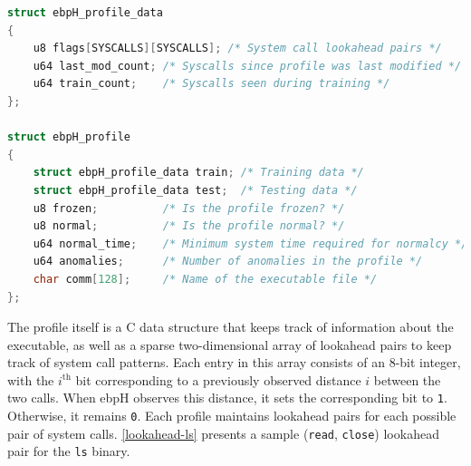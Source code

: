 \documentclass[
  12pt]{findlay}
\newcommand{\passthrough}[1]{#1}
\begin{document}
\begin{lstlisting}[language=c, label={ebph-profile-struct}, caption={A simplified
definition of the ebpH profile struct.}]
struct ebpH_profile_data
{
    u8 flags[SYSCALLS][SYSCALLS]; /* System call lookahead pairs */
    u64 last_mod_count; /* Syscalls since profile was last modified */
    u64 train_count;    /* Syscalls seen during training */
};

struct ebpH_profile
{
    struct ebpH_profile_data train; /* Training data */
    struct ebpH_profile_data test;  /* Testing data */
    u8 frozen;          /* Is the profile frozen? */
    u8 normal;          /* Is the profile normal? */
    u64 normal_time;    /* Minimum system time required for normalcy */
    u64 anomalies;      /* Number of anomalies in the profile */
    char comm[128];     /* Name of the executable file */
};
\end{lstlisting}

The profile itself is a C data structure that keeps track of information
about the executable, as well as a sparse two-dimensional array of
lookahead pairs \autocite{soma07} to keep track of system call patterns.
Each entry in this array consists of an 8-bit integer, with the
\(i^\text{th}\) bit corresponding to a previously observed distance
\(i\) between the two calls. When ebpH observes this distance, it sets
the corresponding bit to \passthrough{\lstinline!1!}. Otherwise, it
remains \passthrough{\lstinline!0!}. Each profile maintains lookahead
pairs for each possible pair of system calls. \autoref{lookahead-ls}
presents a sample (\passthrough{\lstinline!read!},
\passthrough{\lstinline!close!}) lookahead pair for the
\passthrough{\lstinline!ls!} binary.

\FloatBarrier
\end{document}
